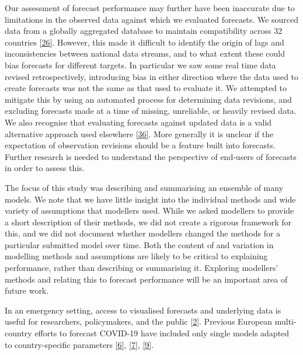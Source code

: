 \documentclass[
]{article}
\begin{document}
Our assessment of forecast performance may further have been inaccurate due to limitations in the observed data against which we evaluated forecasts. We sourced data from a globally aggregated database to maintain compatibility across 32 countries \protect\hyperlink{ref-dongInteractiveWebbasedDashboard2020}{{[}26{]}}. However, this made it difficult to identify the origin of lags and inconsistencies between national data streams, and to what extent these could bias forecasts for different targets. In particular we saw some real time data revised retrospectively, introducing bias in either direction where the data used to create forecasts was not the same as that used to evaluate it. We attempted to mitigate this by using an automated process for determining data revisions, and excluding forecasts made at a time of missing, unreliable, or heavily revised data. We also recognise that evaluating forecasts against updated data is a valid alternative approach used elsewhere \protect\hyperlink{ref-cramerEvaluationIndividualEnsemble2021}{{[}36{]}}. More generally it is unclear if the expectation of observation revisions should be a feature built into forecasts. Further research is needed to understand the perspective of end-users of forecasts in order to assess this.

The focus of this study was describing and summarising an ensemble of many models. We note that we have little insight into the individual methods and wide variety of assumptions that modellers used. While we asked modellers to provide a short description of their methods, we did not create a rigorous framework for this, and we did not document whether modellers changed the methods for a particular submitted model over time. Both the content of and variation in modelling methods and assumptions are likely to be critical to explaining performance, rather than describing or summarising it. Exploring modellers' methods and relating this to forecast performance will be an important area of future work.

In an emergency setting, access to visualised forecasts and underlying data is useful for researchers, policymakers, and the public \protect\hyperlink{ref-cdcCoronavirusDisease20192020}{{[}2{]}}. Previous European multi-country efforts to forecast COVID-19 have included only single models adapted to country-specific parameters \protect\hyperlink{ref-aguasModellingCOVID19Pandemic2020}{{[}6{]}}, \protect\hyperlink{ref-adibParticipatoryModellingApproach2021}{{[}7{]}}, \protect\hyperlink{ref-agostoMonitoringCOVID19Contagion2021}{{[}9{]}}.
\end{document}
